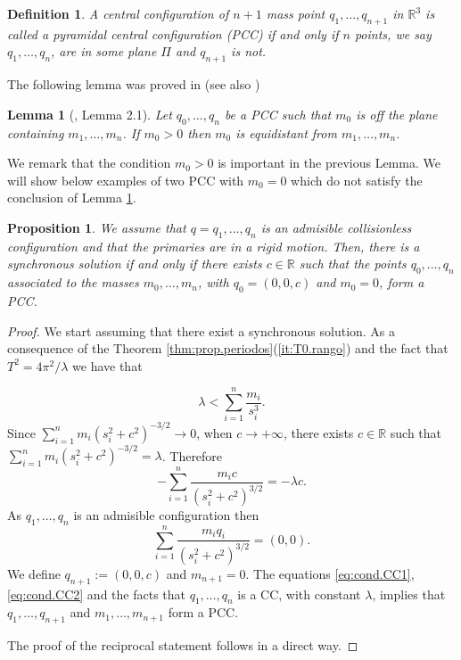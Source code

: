 \documentclass[twoside]{article}
\newtheorem{lem}[thm]{Lemma}
\newtheorem{defi}[thm]{Definition}
\newtheorem{prop}[thm]{Proposition}
\theoremstyle{remark}
\newcommand{\rr}{\mathbb{R}}
\newcounter{example}
\begin{document}
\begin{defi}
A central configuration of $n+1$ mass point $q_1,\ldots,q_{n+1}$ in $\rr^{3}$  is called a pyramidal central configuration (PCC) if and only if $n$ points, we say $q_1,\ldots,q_n$, are in some plane $\Pi$ and $q_{n+1}$ is not.
\end{defi}

The following lemma was proved in \cite{ouyang2004pyramidal} (see also \cite{faycaltesis})
\begin{lem}[\cite{ouyang2004pyramidal}, Lemma 2.1]\label{lem:PCC}
 Let $q_0,\ldots,q_{n}$ be a PCC such that $m_{0}$ is off the plane containing $m_1,\ldots,m_n$. If $m_{0}>0$ then $m_{0}$ is equidistant from $m_1,\ldots,m_n$.
\end{lem}

We remark that the condition $m_{0}>0$ is important in the previous Lemma. We will show below examples of two PCC with $m_{0}=0$ which do not satisfy the conclusion of  Lemma \ref{lem:PCC}.



\begin{prop}\label{cor:sol.sincronica}
We assume that $q=q_1,\ldots,q_n$ is an admisible collisionless configuration and that the primaries are in a rigid motion. Then, there is a synchronous solution if and only if there exists $c\in \rr$ such that the points $q_0,\ldots,q_{n}$ associated to the masses $m_0,\ldots,m_{n}$, with $q_{0}=(0,0,c)$ and $m_{0}=0$, form a PCC.
\end{prop}

\begin{proof}
We start assuming that there exist a synchronous solution. As a consequence of the Theorem \ref{thm:prop.periodos}(\ref{it:T0.rango}) and the fact that $T^2=4\pi^2/\lambda$ we have that

 \begin{equation}\label{eq:lamdbda<suma.si3}
\lambda<\sum_{i=1}^n\frac{m_i}{s_i^3}.
 \end{equation}
 Since $\sum_{i=1}^{n}m_i\left(s_i^2+c^2\right)^{-3/2}\to 0$, when $c\to +\infty$, there exists $c\in \rr$ such that
 $ \sum_{i=1}^{n}m_i\left(s_i^2+c^2\right)^{-3/2}=\lambda$. Therefore
 \begin{equation}\label{eq:cond.CC1}
  -\sum_{i=1}^{n}\frac{m_i c}{\left(s_i^2+c^2\right)^{3/2}}=-\lambda c.
 \end{equation}
As $q_1,\ldots,q_n$ is an admisible configuration then
\begin{equation}\label{eq:cond.CC2}
   \sum_{i=1}^{n}\frac{m_i q_i}{\left(s_i^2+c^2\right)^{3/2}}= (0,0).
\end{equation}
We define  $q_{n+1}:=(0,0,c)$ and $m_{n+1}=0$. The equations \eqref{eq:cond.CC1}, \eqref{eq:cond.CC2}  and the facts that $q_1,\ldots,q_n$ is a CC, with constant $\lambda$,  implies that $q_1,\ldots,q_{n+1}$ and $m_1,\ldots,m_{n+1}$  form a PCC.

The proof of the reciprocal statement follows in a direct way.
\end{proof}
\end{document}
